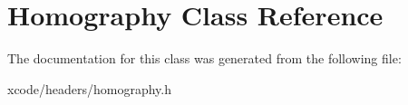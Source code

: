 \hypertarget{class_homography}{\section{Homography Class Reference}
\label{class_homography}
}


The documentation for this class was generated from the following file\-:\begin{DoxyCompactItemize}
\item 
xcode/headers/homography.\-h\end{DoxyCompactItemize}
